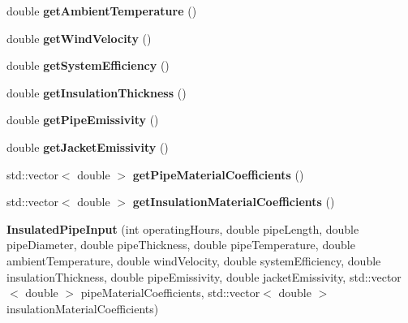 \begin{DoxyCompactItemize}
double {\bfseries get\+Ambient\+Temperature} ()
\item 
\mbox{\label{class_insulated_pipe_input_acf316b239d1bdd7746f89fb3f52a5487}} 
double {\bfseries get\+Wind\+Velocity} ()
\item 
\mbox{\label{class_insulated_pipe_input_ac481d436018a38d58644d1727a7f3410}} 
double {\bfseries get\+System\+Efficiency} ()
\item 
\mbox{\label{class_insulated_pipe_input_af0bdfa676d8826ed34aa3e0bfc79c3d2}} 
double {\bfseries get\+Insulation\+Thickness} ()
\item 
\mbox{\label{class_insulated_pipe_input_a70b22d5788e76295f6de87036cebf1e4}} 
double {\bfseries get\+Pipe\+Emissivity} ()
\item 
\mbox{\label{class_insulated_pipe_input_a48db808f0b2e7ea4f5a13415cceec2ed}} 
double {\bfseries get\+Jacket\+Emissivity} ()
\item 
\mbox{\label{class_insulated_pipe_input_ab06ffcaec576db1da4901482ba1c9d12}} 
std\+::vector$<$ double $>$ {\bfseries get\+Pipe\+Material\+Coefficients} ()
\item 
\mbox{\label{class_insulated_pipe_input_a4df1cca63110c524baa6eba388114616}} 
std\+::vector$<$ double $>$ {\bfseries get\+Insulation\+Material\+Coefficients} ()
\item 
\mbox{\label{class_insulated_pipe_input_a468ececc5c5a120b4e4a008bb9491966}} 
{\bfseries Insulated\+Pipe\+Input} (int operating\+Hours, double pipe\+Length, double pipe\+Diameter, double pipe\+Thickness, double pipe\+Temperature, double ambient\+Temperature, double wind\+Velocity, double system\+Efficiency, double insulation\+Thickness, double pipe\+Emissivity, double jacket\+Emissivity, std\+::vector$<$ double $>$ pipe\+Material\+Coefficients, std\+::vector$<$ double $>$ insulation\+Material\+Coefficients)
\item 
\mbox{\label{class_insulated_pipe_input_a001e1d1dbab85f87e08e05c192bb92e6}} 

\end{DoxyCompactItemize}
